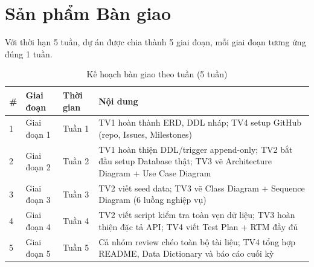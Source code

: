\section{Sản phẩm Bàn giao}
\label{sec:deliverables-list}

Với thời hạn 5 tuần, dự án được chia thành 5 giai đoạn, mỗi giai đoạn tương ứng đúng 1 tuần.

\begin{table}[htbp]
    \centering
    \small
    \caption{Kế hoạch bàn giao theo tuần (5 tuần)}
    \begin{tabular}{|p{0.6cm}|p{2cm}|p{2cm}|p{8cm}|}
        \hline
        \textbf{\#} & \textbf{Giai đoạn} & \textbf{Thời gian} & \textbf{Nội dung} \\
        \hline
        1 & Giai đoạn 1 & Tuần 1 & TV1 hoàn thành ERD, DDL nháp; TV4 setup GitHub (repo, Issues, Milestones) \\
        \hline
        2 & Giai đoạn 2 & Tuần 2 & TV1 hoàn thiện DDL/trigger append-only; TV2 bắt đầu setup Database thật; TV3 vẽ Architecture Diagram + Use Case Diagram \\
        \hline
        3 & Giai đoạn 3 & Tuần 3 & TV2 viết seed data; TV3 vẽ Class Diagram + Sequence Diagram (6 luồng nghiệp vụ) \\
        \hline
        4 & Giai đoạn 4 & Tuần 4 & TV2 viết script kiểm tra toàn vẹn dữ liệu; TV3 hoàn thiện đặc tả API; TV4 viết Test Plan + RTM đầy đủ \\
        \hline
        5 & Giai đoạn 5 & Tuần 5 & Cả nhóm review chéo toàn bộ tài liệu; TV4 tổng hợp README, Data Dictionary và báo cáo cuối kỳ \\
        \hline
    \end{tabular}
\end{table}

